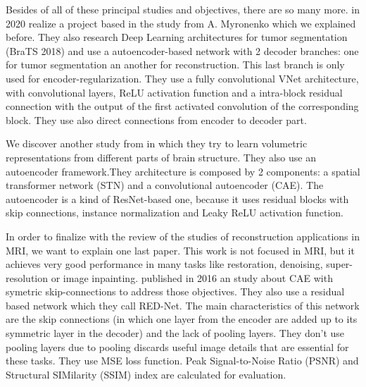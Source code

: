 

Besides of all of these principal studies and objectives, there are so many more.  \cite{otherBraTS2020} in 2020 realize a project based in the study from A. Myronenko \cite{myronenko20183d} which we explained before. They also research Deep Learning architectures for tumor segmentation (BraTS 2018) and use a autoencoder-based network with 2 decoder branches: one for tumor segmentation an another for reconstruction. This last branch is only used for encoder-regularization. They use a fully convolutional VNet architecture, with convolutional layers, ReLU activation function and a intra-block residual
connection with the output of the first activated convolution of the corresponding block. They use also direct connections from encoder to decoder part. 

We discover another study from  in which they try to learn volumetric representations from different parts of brain structure. They also use an autoencoder framework.They architecture is composed by 2 components: a spatial transformer network (STN) and a convolutional autoencoder (CAE). The autoencoder is a kind of ResNet-based one, because it uses residual blocks with skip connections, instance normalization and Leaky ReLU activation function.

In order to finalize with the review of the studies of reconstruction applications in MRI, we want to explain one last paper. This work is not focused in MRI, but it achieves very good performance in many tasks like restoration, denoising, super-resolution or image inpainting.  published in 2016 an study about CAE with symetric skip-connections to address those objectives. They also use a residual based network which they call RED-Net. The main characteristics of this network are the skip connections (in which one layer from the encoder are added up to its symmetric layer in the decoder) and the lack of pooling layers. They don't use pooling layers due to pooling discards useful image details that are essential for these tasks. They use MSE loss function. Peak Signal-to-Noise Ratio
(PSNR) and Structural SIMilarity (SSIM) index are calculated for evaluation.


